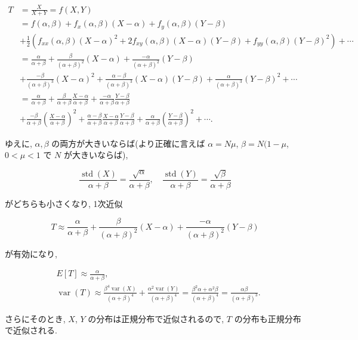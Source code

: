 \documentclass[10pt, a4paper,xelatex,ja=standard]{bxjsarticle}
\newcommand\op{\operatorname}
\begin{document}
\[
\begin{aligned}
T &= \frac{X}{X+Y} = f(X,Y)
\\ &=
f(\alpha, \beta) + f_x(\alpha,\beta)(X-\alpha) + f_y(\alpha,\beta)(Y-\beta)
\\ &+
\frac{1}{2}\left(
f_{xx}(\alpha,\beta)(X-\alpha)^2 +
2f_{xy}(\alpha,\beta)(X-\alpha)(Y-\beta) +
f_{yy}(\alpha,\beta)(Y-\beta)^2
\right) + \cdots
\\ &=
\frac{\alpha}{\alpha+\beta} +
\frac{\beta}{(\alpha+\beta)^2}(X-\alpha) +
\frac{-\alpha}{(\alpha+\beta)^2}(Y-\beta)
\\ &+
\frac{-\beta}{(\alpha+\beta)^3}(X-\alpha)^2 +
\frac{\alpha-\beta}{(\alpha+\beta)^3}(X-\alpha)(Y-\beta) +
\frac{\alpha}{(\alpha+\beta)^3}(Y-\beta)^2
+ \cdots
\\ &=
\frac{\alpha}{\alpha+\beta} +
\frac{\beta}{\alpha+\beta}\frac{X-\alpha}{\alpha+\beta} +
\frac{-\alpha}{\alpha+\beta}\frac{Y-\beta}{\alpha+\beta}
\\ &+
\frac{-\beta}{\alpha+\beta}\left(\frac{X-\alpha}{\alpha+\beta}\right)^2 +
\frac{\alpha-\beta}{\alpha+\beta}
\frac{X-\alpha}{\alpha+\beta}\frac{Y-\beta}{\alpha+\beta} +
\frac{\alpha}{\alpha+\beta}\left(\frac{Y-\beta}{\alpha+\beta}\right)^2
+ \cdots.
\end{aligned}
\]

ゆえに, \(\alpha, \beta\) の両方が大きいならば(より正確に言えば
\(\alpha=N\mu\), \(\beta=N(1-\mu\), \(0<\mu<1\) で \(N\)
が大きいならば),

\[
\frac{\op{std}(X)}{\alpha+\beta} = \frac{\sqrt{\alpha}}{\alpha+\beta}, \quad
\frac{\op{std}(Y)}{\alpha+\beta} = \frac{\sqrt{\beta}}{\alpha+\beta}
\]

がどちらも小さくなり, 1次近似

\[
T \approx
\frac{\alpha}{\alpha+\beta} +
\frac{\beta}{(\alpha+\beta)^2}(X-\alpha) +
\frac{-\alpha}{(\alpha+\beta)^2}(Y-\beta)
\]

が有効になり,

\[
\begin{aligned}
&
E[T] \approx \frac{\alpha}{\alpha+\beta},
\\ &
\op{var}(T) \approx
\frac{\beta^4 \op{var}(X)}{(\alpha+\beta)^4} +
\frac{\alpha^2 \op{var}(Y)}{(\alpha+\beta)^4} =
\frac{\beta^2\alpha + \alpha^2\beta}{(\alpha+\beta)^4} =
\frac{\alpha\beta}{(\alpha+\beta)^3}.
\end{aligned}
\]

さらにそのとき, \(X\), \(Y\) の分布は正規分布で近似されるので, \(T\)
の分布も正規分布で近似される.
\end{document}

